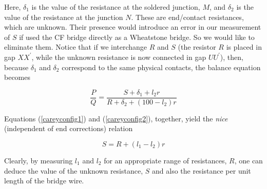 Here, $\delta_{1}$ is the value of the resistance at the soldered junction, $M$, and $\delta_{2}$ is the value of the resistance at the junction $N$. These are end/contact resistances, which are unknown. Their presence would introduce an error in our measurement of $S$ if used the CF bridge directly as a Wheatstone bridge. So we would like to eliminate them. Notice that if we interchange $R$ and $S$ (the resistor $R$ is placed in gap $XX^{\prime}$, while the unknown resistance is now connected in gap $UU^{\prime}$), then, because $\delta_1$ and $\delta_2$ correspond to the same physical contacts, the balance equation becomes

\begin{equation}
\frac{P}{Q}=\frac{S+\delta_{1}+l_{2}r}{R+\delta_{2}+(100-l_{2})r}
\label{careyconfig2}
\end{equation}

Equations (\ref{careyconfig1}) and (\ref{careyconfig2}), together, yield the \textit{nice} (independent of end corrections) relation

\begin{equation}
S = R + (l_1-l_2)r
\label{CF}
\end{equation}

Clearly, by measuring $l_1$ and $l_2$ for an appropriate range of resistances, $R$, one can deduce the value of the unknown resistance, $S$ and also the resistance per unit length of the bridge wire. 

